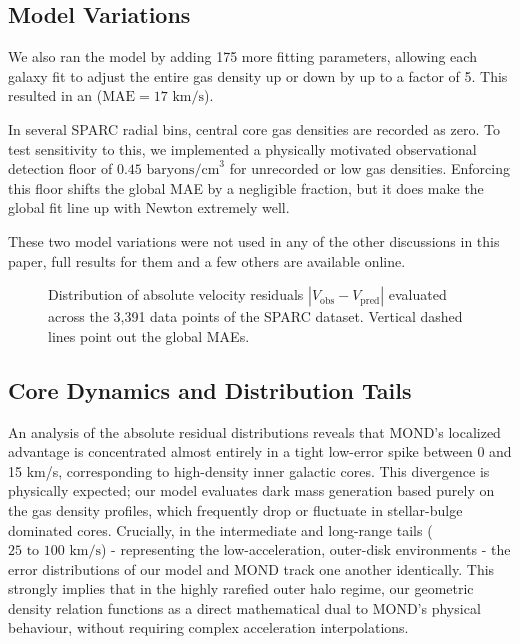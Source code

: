 \documentclass[fleqn,usenatbib]{mnras}
\begin{document}
\subsection{Model Variations}
We also ran the model by adding 175 more fitting parameters, allowing each galaxy fit to adjust the entire gas density up or down by up to a factor of 5. This resulted in an ($\text{MAE} = 17\text{ km/s}$). 

In several SPARC radial bins, central core gas densities are recorded as zero. To test sensitivity to this, we implemented a physically motivated observational detection floor of $0.45\text{ baryons/cm}^3$ for unrecorded or low gas densities. Enforcing this floor shifts the global MAE by a negligible fraction, but it does make the global fit line up with Newton extremely well. 

These two model variations were not used in any of the other discussions in this paper, full results for them and a few others are available online. 

\begin{figure}
\centering
{}
\caption{Distribution of absolute velocity residuals $|V_{\text{obs}} - V_{\text{pred}}|$ evaluated across the 3,391 data points of the SPARC dataset. Vertical dashed lines point out the global MAEs.}
\label{fig:histogram}
\end{figure}

\subsection{Core Dynamics and Distribution Tails}
An analysis of the absolute residual distributions reveals that MOND's localized advantage is concentrated almost entirely in a tight low-error spike between 0 and 15 km/s, corresponding to high-density inner galactic cores. This divergence is physically expected; our model evaluates dark mass generation based purely on the gas density profiles, which frequently drop or fluctuate in stellar-bulge dominated cores. Crucially, in the intermediate and long-range tails ($25\text{ to }100\text{ km/s}$) - representing the low-acceleration, outer-disk environments - the error distributions of our model and MOND track one another identically. This strongly implies that in the highly rarefied outer halo regime, our geometric density relation functions as a direct mathematical dual to MOND's physical behaviour, without requiring complex acceleration interpolations.
\end{document}
